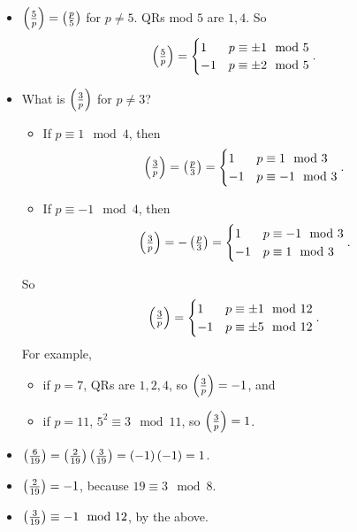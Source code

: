 \begin{example*}
\hfill
\begin{itemize}
\item $ \jacobi{5}{p} = \jacobi{p}{5} $ for $ p \ne 5 $. QRs mod $ 5 $ are $ 1, 4 $. So
$$ \jacobi{5}{p} =
\begin{cases}
1 & p \equiv \pm 1 \mod 5 \\
-1 & p \equiv \pm 2 \mod 5
\end{cases}.
$$
\item What is $ \jacobi{3}{p} $ for $ p \ne 3 $?
\begin{itemize}
\item If $ p \equiv 1 \mod 4 $, then
$$ \jacobi{3}{p} = \jacobi{p}{3} =
\begin{cases}
1 & p \equiv 1 \mod 3 \\
-1 & p \equiv -1 \mod 3
\end{cases}.
$$
\item If $ p \equiv -1 \mod 4 $, then
$$ \jacobi{3}{p} = -\jacobi{p}{3} =
\begin{cases}
1 & p \equiv -1 \mod 3 \\
-1 & p \equiv 1 \mod 3
\end{cases}.
$$
\end{itemize}
So
$$ \jacobi{3}{p} =
\begin{cases}
1 & p \equiv \pm 1 \mod 12 \\
-1 & p \equiv \pm 5 \mod 12
\end{cases}.
$$
For example,
\begin{itemize}
\item if $ p = 7 $, QRs are $ 1, 2, 4 $, so $ \jacobi{3}{p} = -1 $, and
\item if $ p = 11 $, $ 5^2 \equiv 3 \mod 11 $, so $ \jacobi{3}{p} = 1 $.
\end{itemize}
\end{itemize}
\end{example*}

\pagebreak

\begin{example*}
\hfill
\begin{itemize}
\item $ \jacobi{6}{19} = \jacobi{2}{19}\jacobi{3}{19} = \br{-1}\br{-1} = 1 $.
\item $ \jacobi{2}{19} = -1 $, because $ 19 \equiv 3 \mod 8 $.
\item $ \jacobi{3}{19} \equiv -1 \mod 12 $, by the above.
\end{itemize}
\end{example*}


